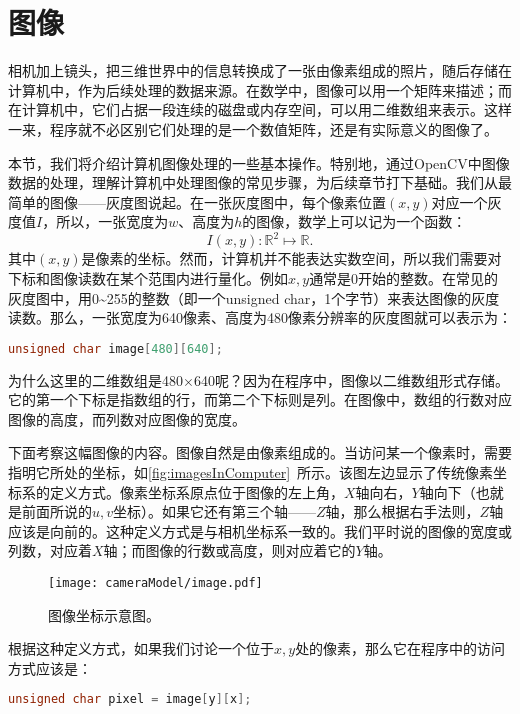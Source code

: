 
\section{图像}
相机加上镜头，把三维世界中的信息转换成了一张由像素组成的照片，随后存储在计算机中，作为后续处理的数据来源。在数学中，图像可以用一个矩阵来描述；而在计算机中，它们占据一段连续的磁盘或内存空间，可以用二维数组来表示。这样一来，程序就不必区别它们处理的是一个数值矩阵，还是有实际意义的图像了。

本节，我们将介绍计算机图像处理的一些基本操作。特别地，通过OpenCV中图像数据的处理，理解计算机中处理图像的常见步骤，为后续章节打下基础。我们从最简单的图像——灰度图说起。在一张灰度图中，每个像素位置$(x,y)$对应一个灰度值$I$，所以，一张宽度为$w$、高度为$h$的图像，数学上可以记为一个函数：
\[
{I} (x,y): \mathbb{R}^2 \mapsto \mathbb{R}.
\]
其中$(x,y)$是像素的坐标。然而，计算机并不能表达实数空间，所以我们需要对下标和图像读数在某个范围内进行量化。例如$x,y$通常是0开始的整数。在常见的灰度图中，用0\textasciitilde255的整数（即一个unsigned char，1个字节）来表达图像的灰度读数。那么，一张宽度为640像素、高度为480像素分辨率的灰度图就可以表示为：

\begin{lstlisting}[language=C++, caption=二维数组表达图像]
unsigned char image[480][640];
\end{lstlisting}

为什么这里的二维数组是480$\times$640呢？因为在程序中，图像以二维数组形式存储。它的第一个下标是指数组的行，而第二个下标则是列。在图像中，数组的行数对应图像的高度，而列数对应图像的宽度。

下面考察这幅图像的内容。图像自然是由像素组成的。当访问某一个像素时，需要指明它所处的坐标，如\autoref{fig:imagesInComputer}~所示。该图左边显示了传统像素坐标系的定义方式。像素坐标系原点位于图像的左上角，$X$轴向右，$Y$轴向下（也就是前面所说的$u,v$坐标）。如果它还有第三个轴——$Z$轴，那么根据右手法则，$Z$轴应该是向前的。这种定义方式是与相机坐标系一致的。我们平时说的图像的宽度或列数，对应着$X$轴；而图像的行数或高度，则对应着它的$Y$轴。

\begin{figure}[!t]
	\centering
	\texttt{[image: cameraModel/image.pdf]}
	\caption{图像坐标示意图。}
	\label{fig:imagesInComputer}
\end{figure}
	
根据这种定义方式，如果我们讨论一个位于$x,y$处的像素，那么它在程序中的访问方式应该是：
\begin{lstlisting}[language=C++, caption=访问图像像素]
unsigned char pixel = image[y][x];
\end{lstlisting}

